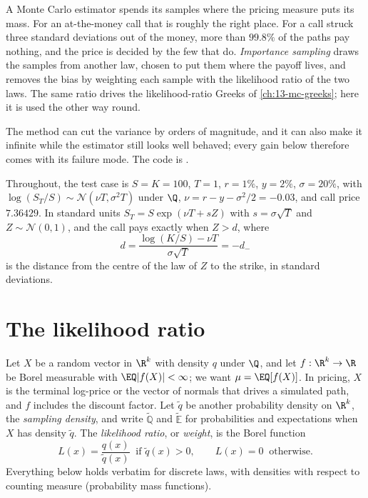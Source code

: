 \providecommand{\Qt}{\widetilde{\mathbb Q}}
\providecommand{\Et}{\widetilde{\mathbb E}}

A Monte Carlo estimator spends its samples where the pricing measure puts its mass. For an
at-the-money call that is roughly the right place. For a call struck three standard
deviations out of the money, more than $99.8\%$ of the paths pay nothing, and the price is
decided by the few that do. \emph{Importance sampling} draws the samples from another law,
chosen to put them where the payoff lives, and removes the bias by weighting each sample
with the likelihood ratio of the two laws. The same ratio drives the likelihood-ratio Greeks
of \cref{ch:13-mc-greeks}; here it is used the other way round.

The method can cut the variance by orders of magnitude, and it can also make it infinite
while the estimator still looks well behaved; every gain below therefore comes with its
failure mode. The code is .

Throughout, the test case is $S=K=100$, $T=1$, $r=1\%$, $y=2\%$, $\sigma=20\%$, with
$\log(S_T/S)\sim\mathcal N(\nu T,\sigma^2T)$ under $\Q$, $\nu=r-y-\sigma^2/2=-0.03$, and
call price $7.36429$. In standard units $S_T=S\exp(\nu T+sZ)$ with $s=\sigma\sqrt T$ and
$Z\sim\mathcal N(0,1)$, and the call pays exactly when $Z>d$, where
\[
  d=\frac{\log(K/S)-\nu T}{\sigma\sqrt T}=-d_-
\]
is the distance from the centre of the law of $Z$ to the strike, in standard deviations.

\section{The likelihood ratio}\label{sec:is-lr}

Let $X$ be a random vector in $\R^k$ with density $q$ under $\Q$, and let $f:\R^k\to\R$ be
Borel measurable with $\EQ|f(X)|<\infty$; we want $\mu=\EQ[f(X)]$. In pricing, $X$ is the
terminal log-price or the vector of normals that drives a simulated path, and $f$ includes
the discount factor. Let $\tilde q$ be another probability density on $\R^k$, the
\emph{sampling density}, and write $\Qt$ and $\Et$ for probabilities and expectations when
$X$ has density $\tilde q$. The \emph{likelihood ratio}, or \emph{weight}, is the Borel
function
\[
  L(x)=\frac{q(x)}{\tilde q(x)}\ \text{ if }\tilde q(x)>0,\qquad L(x)=0\ \text{ otherwise}.
\]
Everything below holds verbatim for discrete laws, with densities with respect to counting
measure (probability mass functions).


